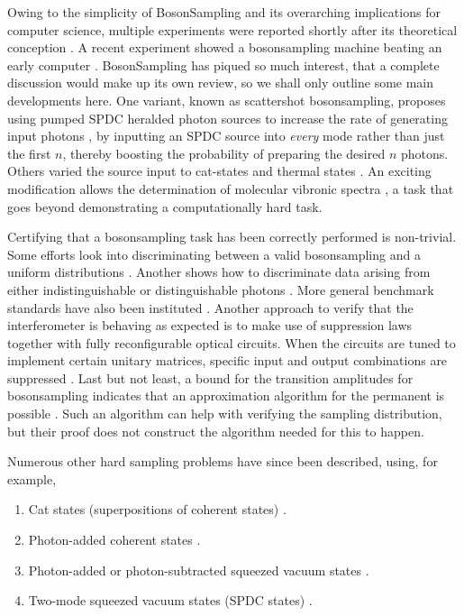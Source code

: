 \documentclass[times,final]{elsarticle}
\begin{document}
Owing to the simplicity of {\sc BosonSampling} and its overarching implications for computer science, multiple experiments were reported shortly after its theoretical conception \cite{bib:Tillmann13,bib:Spring13, bib:Broome13,bib:Crespi13}. A recent experiment showed a {\sc bosonsampling} machine beating an early computer \cite{bib:WangHe16}.
{\sc BosonSampling} has piqued so much interest, that a complete discussion would make up its own review, so we shall only outline some main developments here. One variant, known as scattershot {\sc bosonsampling}, proposes using pumped SPDC heralded photon sources to increase the rate of generating input photons \cite{bib:Lund14,bib:Bentivegna15}, by inputting an SPDC source into \emph{every} mode rather than just the first $n$, thereby boosting the probability of preparing the desired $n$ photons. Others varied the source input to cat-states \cite{bib:Rohde15} and thermal states \cite{bib:Tamma14_thermal} . An exciting modification allows the determination of molecular vibronic spectra \cite{bib:Huh15}, a task that goes beyond demonstrating a computationally hard task.

Certifying that a {\sc bosonsampling} task has been correctly performed is non-trivial. Some efforts look into discriminating between a valid {\sc bosonsampling} and a uniform distributions \cite{bib:Gogolin13,bib:Aaronson13}. Another shows how to discriminate data arising from either indistinguishable or distinguishable photons \cite{bib:Spagnolo14,bib:Carolan14}. More general benchmark standards have also been instituted \cite{bib:Walschaeprs16}. Another approach to verify that the interferometer is behaving as expected is to make use of suppression laws \cite{bib:Tichy14} together with fully reconfigurable optical circuits. When the circuits are tuned to implement certain unitary matrices, specific input and output combinations are suppressed \cite{bib:Crespi16}. Last but not least, a bound for the transition amplitudes for {\sc bosonsampling} indicates that an approximation algorithm for the permanent is possible \cite{bib:Yung16}. Such an algorithm can help with verifying the sampling distribution, but their proof does not construct the algorithm needed for this to happen.

Numerous other hard sampling problems have since been described, using, for example,
\begin{enumerate}
	\item Cat states (superpositions of coherent states) \cite{RohdeCat15}.
	\item Photon-added coherent states \cite{RohdeDisp15}.
	\item Photon-added or photon-subtracted squeezed vacuum states \cite{RohdePhotAdd15}.
	\item Two-mode squeezed vacuum states (SPDC states) \cite{SalehSPDC}.
\end{enumerate}
\end{document}
